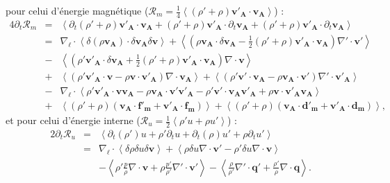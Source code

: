 pour celui d'énergie magnétique ($\mathcal{R}_{m} = \frac{1}{4}\left<\left(\rho'+\rho\right)\boldsymbol{v'_A} \cdot \boldsymbol{v_A}\right> $) :
\begin{eqnarray}
\label{eq:turb_cpi_Rm} 4\partial_t \mathcal{R}_{m} &=& \left<\partial_t \left(\rho'+\rho\right) \boldsymbol{v'_A} \cdot  \boldsymbol{v_A}  +  \left(\rho'+\rho \right) \boldsymbol{v'_A} \cdot  \partial_t \boldsymbol{v_A} +   \left(\rho'+\rho\right) \boldsymbol{v'_A} \cdot  \partial_t \boldsymbol{v_A} \right>\nonumber \\
&=&\nabla_{\boldsymbol{\ell}} \cdot \left<\delta \left(\rho\boldsymbol{v_A}\right) \cdot \delta \boldsymbol{v_A} \delta \boldsymbol{v} \right> + \left<\left(\rho \boldsymbol{v_A} \cdot \delta \boldsymbol{v_A} -\frac{1}{2} \left(\rho'+\rho\right) \boldsymbol{v'_A} \cdot \boldsymbol{v_A}\right)\nabla' \cdot \boldsymbol{v'}\right>\nonumber\\
&-&  \left<\left(\rho' \boldsymbol{v'_A} \cdot \delta \boldsymbol{v_A} + \frac{1}{2} \left(\rho'+\rho\right) \boldsymbol{v'_A} \cdot \boldsymbol{v_A}\right)\nabla \cdot \boldsymbol{v}\right>\\
&+& \left<\left( \rho' \boldsymbol{v'_A} \cdot \boldsymbol{v} - \rho \boldsymbol{v} \cdot \boldsymbol{v'_A}  \right)\nabla \cdot \boldsymbol{v_A} \right> + \left<\left(\rho' \boldsymbol{v'} \cdot \boldsymbol{v_A} -  \rho \boldsymbol{v_A} \cdot \boldsymbol{v'} \right)\nabla' \cdot \boldsymbol{v'_A} \right>\nonumber\\
&-&\nabla_{\boldsymbol{\ell}} \cdot \left< \rho' \boldsymbol{v'_A}\cdot  \boldsymbol{v} \boldsymbol{v_A} - \rho \boldsymbol{v_A}\cdot  \boldsymbol{v'} \boldsymbol{v'_A}-\rho' \boldsymbol{v'} \cdot\boldsymbol{v_A}\boldsymbol{v'_A} +  \rho  \boldsymbol{v} \cdot\boldsymbol{v'_A}\boldsymbol{v_A}\right> \nonumber\\
&+&  \left<\left(\rho' + \rho\right)\left(\boldsymbol{v_A} \cdot \boldsymbol{f'_m} + \boldsymbol{v'_A} \cdot \boldsymbol{f_m}\right) \right>+ \left<\left(\rho' + \rho\right)\left(\boldsymbol{v_A} \cdot \boldsymbol{d'_m} + \boldsymbol{v'_A} \cdot \boldsymbol{d_m}\right)\right> , \nonumber
\end{eqnarray}
et pour celui d'énergie interne ($\mathcal{R}_{u} = \frac{1}{2}\left<\rho' u+\rho u'\right> $) :
\begin{eqnarray}
\label{eq:turb_cpi_Ru} 2\partial_t \mathcal{R}_{u} &=& \left<\partial_t \left(\rho'\right) u  + \rho' \partial_t u + \partial_t \left(\rho\right) u' + \rho \partial_t u'\right> \nonumber\\
&=&\nabla_{\boldsymbol{\ell}} \cdot \left<\delta \rho  \delta u \delta \boldsymbol{v} \right> + \left<  \rho \delta u \nabla \cdot \boldsymbol{v'}- \rho' \delta u \nabla \cdot \boldsymbol{v}\right> \nonumber\\
&&-\left< \rho' \frac{p}{\rho}   \nabla \cdot \boldsymbol{v}  + \rho \frac{p'}{\rho'}   \nabla' \cdot \boldsymbol{v'} \right> -\left<\frac{\rho}{\rho'}  \nabla' \cdot \boldsymbol{q'} + \frac{\rho'}{\rho}  \nabla \cdot \boldsymbol{q}  \right> .
\end{eqnarray}

